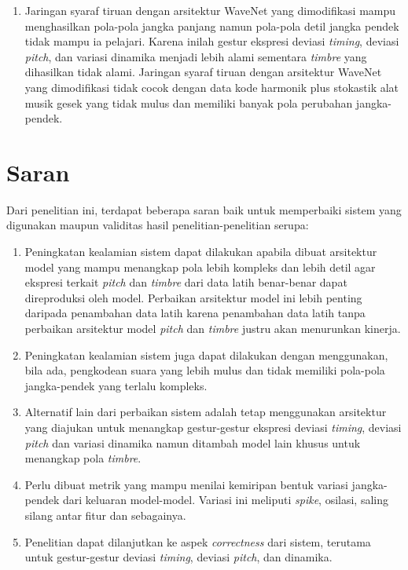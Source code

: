 \begin{enumerate}
\item Jaringan syaraf tiruan dengan arsitektur WaveNet yang dimodifikasi mampu menghasilkan pola-pola jangka panjang namun pola-pola detil jangka pendek tidak mampu ia pelajari. Karena inilah gestur ekspresi deviasi \textit{timing}, deviasi \textit{pitch}, dan variasi dinamika menjadi lebih alami sementara \textit{timbre} yang dihasilkan tidak alami. Jaringan syaraf tiruan dengan arsitektur WaveNet yang dimodifikasi tidak cocok dengan data kode harmonik plus stokastik alat musik gesek yang tidak mulus dan memiliki banyak pola perubahan jangka-pendek.

\end{enumerate}

\section{Saran}

Dari penelitian ini, terdapat beberapa saran baik untuk memperbaiki sistem yang digunakan maupun validitas hasil penelitian-penelitian serupa:
\begin{enumerate}
	\item Peningkatan kealamian sistem dapat dilakukan apabila dibuat arsitektur model yang mampu menangkap pola lebih kompleks dan lebih detil agar ekspresi terkait \textit{pitch} dan \textit{timbre} dari data latih benar-benar dapat direproduksi oleh model. Perbaikan arsitektur model ini lebih penting daripada penambahan data latih karena penambahan data latih tanpa perbaikan arsitektur model \textit{pitch} dan \textit{timbre} justru akan menurunkan kinerja.
	\item Peningkatan kealamian sistem juga dapat dilakukan dengan menggunakan, bila ada, pengkodean suara yang lebih mulus dan tidak memiliki pola-pola jangka-pendek yang terlalu kompleks.
	\item Alternatif lain dari perbaikan sistem adalah tetap menggunakan arsitektur yang diajukan untuk menangkap gestur-gestur ekspresi deviasi \textit{timing}, deviasi \textit{pitch} dan variasi dinamika namun ditambah model lain khusus untuk menangkap pola \textit{timbre}.
	\item Perlu dibuat metrik yang mampu menilai kemiripan bentuk variasi jangka-pendek dari keluaran model-model. Variasi ini meliputi \textit{spike}, osilasi, saling silang antar fitur dan sebagainya.
	\item Penelitian dapat dilanjutkan ke aspek \textit{correctness} dari sistem, terutama untuk gestur-gestur deviasi \textit{timing}, deviasi \textit{pitch}, dan dinamika.
\end{enumerate}